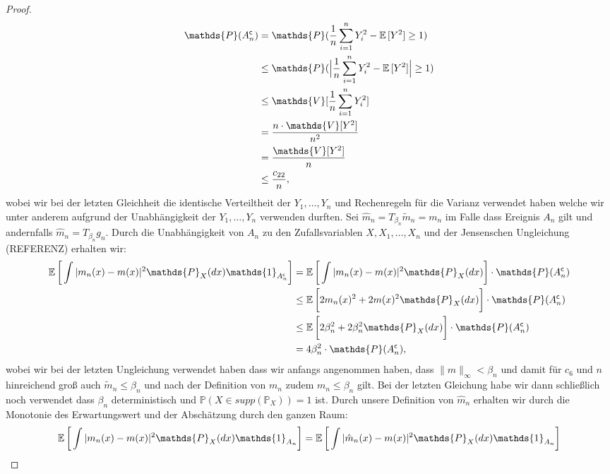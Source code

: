 \begin{proof}
\begin{equation}
\begin{split}
\mathds{P}(A_n^{\mathsf{c}}) & = \mathds{P}(\frac{1}{n}\sum_{i=1}^n Y_i^2 - \E[Y^2] \geq 1) \\
& \leq \mathds{P}(\Big|\frac{1}{n}\sum_{i=1}^n Y_i^2 - \E[Y^2]\Big| \geq 1) \\
& \leq \mathds{V}[\frac{1}{n}\sum_{i = 1}^nY_i^2] \\
& = \frac{n \cdot  \mathds{V}[Y^2]}{n^2} \\
& = \frac{\mathds{V}[Y^2]}{n} \\
& \leq \frac{c_{22}}{n},
\end{split}
\end{equation}
wobei wir bei der letzten Gleichheit die identische Verteiltheit der $Y_1,\dots,Y_n$ und Rechenregeln für die Varianz verwendet haben welche wir unter anderem aufgrund der Unabhängigkeit der $Y_1,\dots,Y_n$ verwenden durften.
Sei $\hat{m}_n = T_{\beta_n}\tilde{m}_n = m_n$ im Falle dass Ereignis $A_n$ gilt und andernfalls $\hat{m}_n = T_{\beta_n}g_n$. Durch die Unabhängigkeit von $A_n$ zu den Zufallsvariablen $X, X_1, \dots, X_n$ und der Jensenschen Ungleichung (REFERENZ) erhalten wir:
\begin{equation}
\label{anc}
\begin{split}
 \E \bigg[\int |m_n(x) - m(x)|^2 \mathds{P}_X(dx) \mathds{1}_{A_n^{\mathsf{c}}}\bigg] & =  \E \bigg[\int |m_n(x) - m(x)|^2 \mathds{P}_X(dx) \bigg] \cdot \mathds{P}(A_n^{\mathsf{c}}) \\
 & \leq \E \bigg[2m_n(x)^2 + 2m(x)^2 \mathds{P}_X(dx)\bigg] \cdot \mathds{P}(A_n^{\mathsf{c}})\\
 & \leq \E \bigg[2\beta_n^2 + 2\beta_n^2 \mathds{P}_X(dx)\bigg] \cdot \mathds{P}(A_n^{\mathsf{c}})\\
 & = 4\beta_n^2 \cdot \mathds{P}(A_n^{\mathsf{c}}),
\end{split}
\end{equation}
wobei wir bei der letzten Ungleichung verwendet haben dass wir anfangs angenommen haben, dass $\|m\|_{\infty} < \beta_n$ und damit für $c_6$ und $n$ hinreichend groß auch $\tilde{m}_n \leq \beta_n$ und nach der Definition von $m_n$ zudem $m_n \leq \beta_n$ gilt. Bei der letzten Gleichung habe wir dann schließlich noch verwendet dass $\beta_n$ deterministisch und $\mathds{P}(X \in supp(\mathds{P}_X)) = 1$ ist.
Durch unsere Definition von $\hat{m}_n$ erhalten wir durch die Monotonie des Erwartungswert und der Abschätzung durch den ganzen Raum:
\begin{equation}
\label{an}
\begin{split}
\E \bigg[\int |m_n(x) - m(x)|^2 \mathds{P}_X(dx) \mathds{1}_{A_n}\bigg] & = \E \bigg[\int |\hat{m}_n(x) - m(x)|^2 \mathds{P}_X(dx) \mathds{1}_{A_n}\bigg] \\

\end{split}
\end{equation}
\end{proof}

